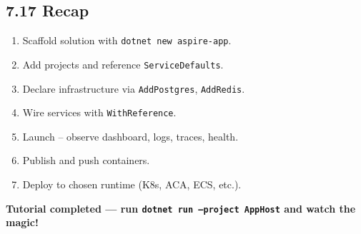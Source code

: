 \documentclass[table]{article}
\begin{document}
\subsection*{7.17 \faThumbsUp\enspace Recap}
\begin{enumerate}
  \item Scaffold solution with \verb|dotnet new aspire-app|.
  \item Add projects and reference \texttt{ServiceDefaults}.
  \item Declare infrastructure via \verb|AddPostgres|, \verb|AddRedis|.
  \item Wire services with \verb|WithReference|.
  \item Launch – observe dashboard, logs, traces, health.
  \item Publish and push containers.
  \item Deploy to chosen runtime (K8s, ACA, ECS, etc.).
\end{enumerate}

\begin{center}
\Large\bfseries\color{pgreen}
\faCheckCircle\enspace Tutorial completed —
run \texttt{dotnet run --project AppHost} and watch the magic!
\end{center}
\end{document}
